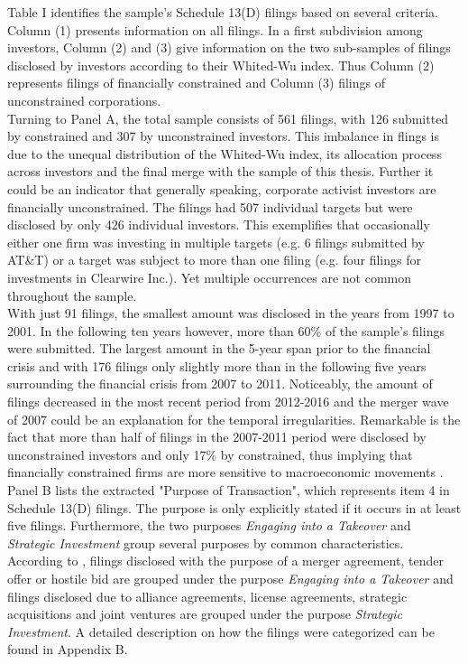 \documentclass[12pt]{article}
\begin{document}
Table I identifies the sample's Schedule 13(D) filings based on several criteria. Column (1) presents information on all filings. In a first subdivision among investors, Column (2) and (3) give information on the two sub-samples of filings disclosed by investors according to their Whited-Wu index. Thus Column (2) represents filings of financially constrained and Column (3) filings of unconstrained corporations.\\
Turning to Panel A, the total sample consists of 561 filings, with 126 submitted by constrained and 307 by unconstrained investors. This imbalance in flings is due to the unequal distribution of the Whited-Wu index, its allocation process across investors and the final merge with the sample of this thesis. Further it could be an indicator that generally speaking, corporate activist investors are financially unconstrained. The filings had 507 individual targets but were disclosed by only 426 individual investors. This exemplifies that occasionally either one firm was investing in multiple targets (e.g. 6 filings submitted by AT\&T) or a target was subject to more than one filing (e.g. four filings for investments in Clearwire Inc.). Yet multiple occurrences are not common throughout the sample.\\ 
With just 91 filings, the smallest amount was disclosed in the years from 1997 to 2001. In the following ten years however, more than 60\% of the sample's filings were submitted. The largest amount in the 5-year span prior to the financial crisis and with 176 filings only slightly more than in the following five years surrounding the financial crisis from 2007 to 2011. Noticeably, the amount of filings decreased in the most recent period from 2012-2016 and the merger wave of 2007 \citep[p.19]{Huang2017} could be an explanation for the temporal irregularities. Remarkable is the fact that more than half of filings in the 2007-2011 period were disclosed by unconstrained investors and only 17\% by constrained, thus implying that financially constrained firms are more sensitive to macroeconomic movements \citep[p.1197]{Campello2006}.\\
Panel B lists the extracted "Purpose of Transaction", which represents item 4 in Schedule 13(D) filings. The purpose is only explicitly stated if it occurs in at least five filings. Furthermore, the two purposes \emph{Engaging into a Takeover} and \emph{Strategic Investment} group several purposes by common characteristics. According to \citet[p.1]{Betton2008}, filings disclosed with the purpose of a merger agreement, tender offer or hostile bid are grouped under the purpose \emph{Engaging into a Takeover} and filings disclosed due to alliance agreements, license agreements, strategic acquisitions and joint ventures are grouped under the purpose \emph{Strategic Investment}. A detailed description on how the filings were categorized can be found in Appendix B. 
\end{document}
